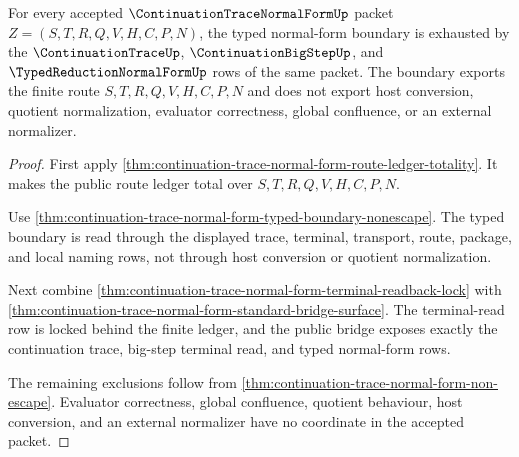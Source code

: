 \begin{theorem}
\label{thm:continuation-trace-normal-form-normal-boundary-exhaustion}
For every accepted $\ContinuationTraceNormalFormUp$ packet $Z=(S,T,R,Q,V,H,C,P,N)$, the typed normal-form boundary is exhausted by the $\ContinuationTraceUp$, $\ContinuationBigStepUp$, and $\TypedReductionNormalFormUp$ rows of the same packet. The boundary exports the finite route $S,T,R,Q,V,H,C,P,N$ and does not export host conversion, quotient normalization, evaluator correctness, global confluence, or an external normalizer.
\end{theorem}
\begin{proof}
First apply \autoref{thm:continuation-trace-normal-form-route-ledger-totality}. It makes the public route ledger total over $S,T,R,Q,V,H,C,P,N$.

Use \autoref{thm:continuation-trace-normal-form-typed-boundary-nonescape}. The typed boundary is read through the displayed trace, terminal, transport, route, package, and local naming rows, not through host conversion or quotient normalization.

Next combine \autoref{thm:continuation-trace-normal-form-terminal-readback-lock} with \autoref{thm:continuation-trace-normal-form-standard-bridge-surface}. The terminal-read row is locked behind the finite ledger, and the public bridge exposes exactly the continuation trace, big-step terminal read, and typed normal-form rows.

The remaining exclusions follow from \autoref{thm:continuation-trace-normal-form-non-escape}. Evaluator correctness, global confluence, quotient behaviour, host conversion, and an external normalizer have no coordinate in the accepted packet.
\end{proof}

